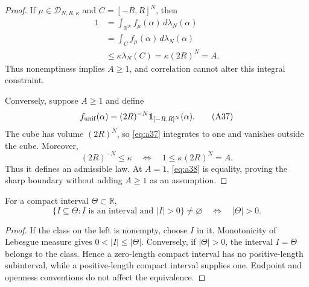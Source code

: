 \begin{proof}
If $\mu\in\mathcal D_{N,R,\kappa}$ and $C=[-R,R]^N$, then
\[
\begin{aligned}
1
&=\int_{\mathbb R^N}f_\mu(\alpha)\,d\lambda_N(\alpha)\\
&=\int_Cf_\mu(\alpha)\,d\lambda_N(\alpha)\\
&\leq\kappa\lambda_N(C)
=\kappa(2R)^N=A.
\end{aligned}
\tag{A36}\label{eq:a36}
\]
Thus nonemptiness implies $A\geq1$, and correlation cannot alter this
integral constraint.

Conversely, suppose $A\geq1$ and define
\[
f_{\rm unif}(\alpha)=(2R)^{-N}\mathbf 1_{[-R,R]^N}(\alpha).
\tag{A37}\label{eq:a37}
\]
The cube has volume $(2R)^N$, so \eqref{eq:a37} integrates to one and
vanishes outside the cube.  Moreover,
\[
(2R)^{-N}\leq\kappa
\quad\Longleftrightarrow\quad1\leq\kappa(2R)^N=A.
\tag{A38}\label{eq:a38}
\]
Thus it defines an admissible law.  At $A=1$, \eqref{eq:a38} is equality,
proving the sharp boundary without adding $A\geq1$ as an assumption.
\end{proof}

\begin{lemma}
\label{lem:interval-class-nonempty}
For a compact interval $\Theta\subset\mathbb R$,
\[
\{I\subseteq\Theta:I\text{ is an interval and }|I|>0\}
\neq\varnothing
\quad\Longleftrightarrow\quad|\Theta|>0.
\tag{A39}\label{eq:a39}
\]
\end{lemma}

\begin{proof}
If the class on the left is nonempty, choose $I$ in it.  Monotonicity of
Lebesgue measure gives $0<|I|\leq|\Theta|$.  Conversely, if
$|\Theta|>0$, the interval $I=\Theta$ belongs to the class.  Hence a
zero-length compact interval has no positive-length subinterval, while a
positive-length compact interval supplies one.  Endpoint and openness
conventions do not affect the equivalence.
\end{proof}

